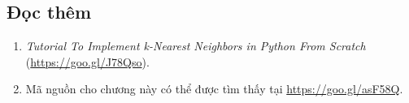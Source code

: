 






\subsection{Đọc thêm}



\begin{enumerate}
    \item \textit{Tutorial To Implement k-Nearest Neighbors in Python From
    Scratch} (\url{https://goo.gl/J78Qso}).

    \item Mã nguồn cho chương này có thể được tìm thấy tại \url{https://goo.gl/asF58Q}.

\end{enumerate}

